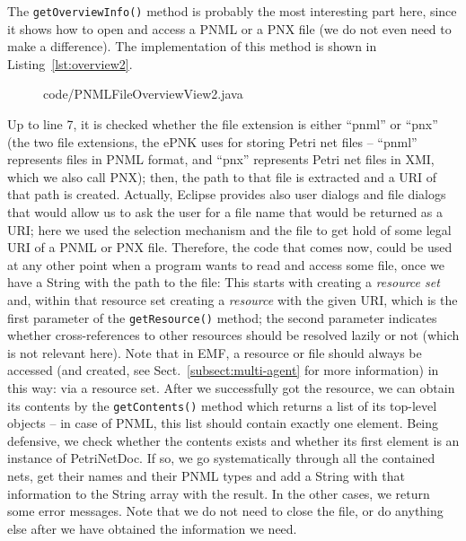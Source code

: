 The {\tt getOverviewInfo()} method is probably the most interesting
part here, since it shows how to open and access a PNML or a
PNX file (we do not even need to make a difference). The implementation
of this method is shown in Listing~\ref{lst:overview2}.
%
\begin{figure}[htbp!]
%
  {code/PNMLFileOverviewView2.java}
\end{figure}
% 
Up to line 7, it is checked whether the file extension is
either ``pnml'' or ``pnx'' (the two file extensions, the ePNK uses
for storing Petri net files -- ``pnml'' represents files in PNML format, and
``pnx'' represents Petri net files in XMI, which we also call PNX); then, the
path to that file is extracted and a URI of that path is created.
Actually, Eclipse provides also user dialogs and file dialogs that would
allow us to ask the user for a file name that would be returned as a URI; here
we used the selection mechanism and the file to get hold of some legal URI
of a PNML or PNX file. Therefore, the code that comes now, could be used at any
other point when a program wants to read and access some file, once we have a
String with the path to the file: This starts with creating a \emph{resource
set}%
and, within that resource set creating a \emph{resource}%
with the given URI, which is the first parameter of the {\tt getResource()}%
method; the second parameter indicates whether cross-references to other resources should be
resolved lazily or not (which is not relevant here). Note that in EMF, a
resource or file should always be accessed (and created, see
Sect.~\ref{subsect:multi-agent} for more information) in this way: via a
resource set. After we successfully got the resource, we can obtain its contents
by the {\tt getContents()}%
method which returns a list of its top-level objects
-- in case of PNML, this list should contain exactly one element. 
Being defensive, we check whether the contents exists and whether its first element is an instance
of PetriNetDoc. If so, we go systematically through all the contained nets, get
their names and their PNML types and add a String with that information to the
String array with the result. In the other cases, we return some error
messages. Note that we do not need to close the file, or do anything else after
we have obtained the information we need.

